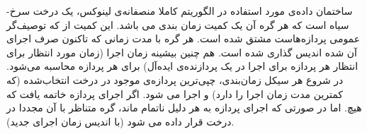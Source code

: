 ساختمان داده‌ی مورد استفاده در الگوریتم کاملا منصفانه‌ی لینوکس، یک درخت سرخ-سیاه
است که هر گره آن یک کمیت زمان بندی
می باشد. این کمیت از
که توصیف‌گر عمومی پردازه‌هاست مشتق شده است. هر گره با مدت زمانی که تاکنون صرف اجرای آن شده
اندیس گذاری شده است. هم چنین بیشینه زمان اجرا
(زمان مورد انتظار برای انتظار هر پردازه برای اجرا در یک پردازنده‌ی ایده‌آل) برای هر پردازه محاسبه می‌شود. در شروع هر سیکل زمان‌بندی، چپی‌ترین پردازه‌ی موجود در درخت انتخاب‌شده (که کمترین مدت زمان اجرا را دارد) و اجرا می شود. اگر اجرای پردازه خاتمه یافت که هیچ. اما در صورتی که اجرای پردازه به هر دلیل ناتمام ماند، گره متناظر با آن مجددا در درخت قرار داده می شود (با اندیس زمان اجرای جدید).